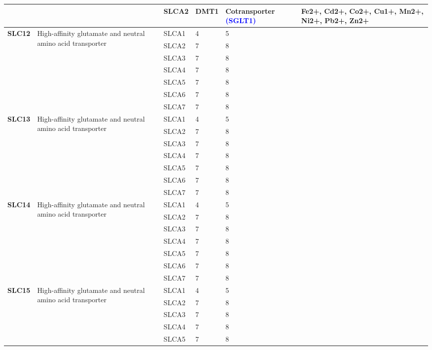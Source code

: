 \documentclass[12pt]{report}
\begin{document}
\begin{center}
\begin{longtable}{|p{1.5cm}|p{3.2cm}|p{1.9cm}|p{1.65cm}|p{3cm}|p{3cm}|}
\cline{3-6}
&&SLCA2& DMT1 & Cotransporter \textcolor{blue}{(SGLT1) \cite{mackenzie2006divalent, nevo2008site}}& Fe2+, Cd2+, Co2+, Cu1+, Mn2+, Ni2+, Pb2+, Zn2+\\ 
\hline
\multirow{7}{1.5cm}{\textbf{SLC12}} & \multirow{7}{4cm}{High-affinity glutamate and neutral amino acid transporter} & SLCA1 & 4 & 5 &\\ 
\cline{3-6}
&&SLCA2&7 & 8&\\ 
\cline{3-6}
&&SLCA3&7 & 8&\\ 
\cline{3-6}
&&SLCA4&7 & 8&\\ 
\cline{3-6}
&&SLCA5&7 & 8&\\ 
\cline{3-6}
&&SLCA6&7 & 8&\\ 
\cline{3-6}
&&SLCA7&7 & 8&\\ 
\hline
\multirow{7}{1.5cm}{\textbf{SLC13}} & \multirow{7}{4cm}{High-affinity glutamate and neutral amino acid transporter} & SLCA1 & 4 & 5\\ 
\cline{3-6}
&&SLCA2&7 & 8&\\ 
\cline{3-6}
&&SLCA3&7 & 8&\\ 
\cline{3-6}
&&SLCA4&7 & 8&\\ 
\cline{3-6}
&&SLCA5&7 & 8&\\ 
\cline{3-6}
&&SLCA6&7 & 8&\\ 
\cline{3-6}
&&SLCA7&7 & 8&\\ 
\hline
\multirow{7}{1.5cm}{\textbf{SLC14}} & \multirow{7}{4cm}{High-affinity glutamate and neutral amino acid transporter} & SLCA1 & 4 & 5\\ 
\cline{3-6}
&&SLCA2&7 & 8&\\ 
\cline{3-6}
&&SLCA3&7 & 8&\\ 
\cline{3-6}
&&SLCA4&7 & 8&\\ 
\cline{3-6}
&&SLCA5&7 & 8&\\ 
\cline{3-6}
&&SLCA6&7 & 8&\\ 
\cline{3-6}
&&SLCA7&7 & 8&\\ 
\hline
\multirow{7}{1.5cm}{\textbf{SLC15}} & \multirow{7}{4cm}{High-affinity glutamate and neutral amino acid transporter} & SLCA1 & 4 & 5\\ 
\cline{3-6}
&&SLCA2&7 & 8&\\ 
\cline{3-6}
&&SLCA3&7 & 8&\\ 
\cline{3-6}
&&SLCA4&7 & 8&\\ 
\cline{3-6}
&&SLCA5&7 & 8&\\ 

\end{longtable}
\end{center}
\end{document}
